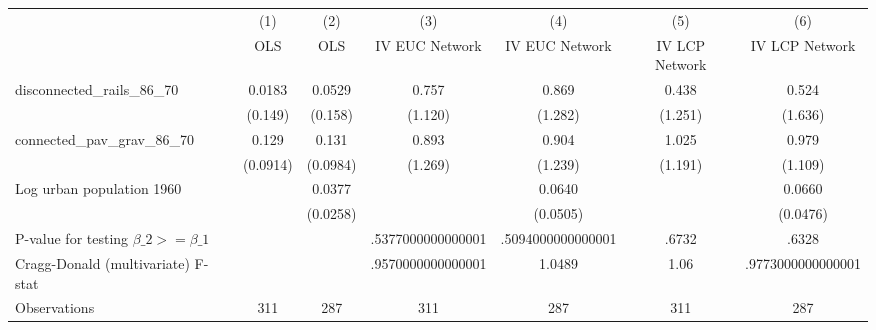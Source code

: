 {
\def\sym#1{\ifmmode^{#1}\else\(^{#1}\)\fi}
\begin{tabular}{l*{6}{c}}
\hline\hline
                &\multicolumn{1}{c}{(1)}&\multicolumn{1}{c}{(2)}&\multicolumn{1}{c}{(3)}&\multicolumn{1}{c}{(4)}&\multicolumn{1}{c}{(5)}&\multicolumn{1}{c}{(6)}\\
                &\multicolumn{1}{c}{OLS}&\multicolumn{1}{c}{OLS}&\multicolumn{1}{c}{IV EUC Network}&\multicolumn{1}{c}{IV EUC Network}&\multicolumn{1}{c}{IV LCP Network}&\multicolumn{1}{c}{IV LCP Network}\\
\hline
disconnected\_rails\_86\_70&   0.0183         &   0.0529         &    0.757         &    0.869         &    0.438         &    0.524         \\
                &  (0.149)         &  (0.158)         &  (1.120)         &  (1.282)         &  (1.251)         &  (1.636)         \\
[1em]
connected\_pav\_grav\_86\_70&    0.129         &    0.131         &    0.893         &    0.904         &    1.025         &    0.979         \\
                & (0.0914)         & (0.0984)         &  (1.269)         &  (1.239)         &  (1.191)         &  (1.109)         \\
[1em]
Log urban population 1960&                  &   0.0377         &                  &   0.0640         &                  &   0.0660         \\
                &                  & (0.0258)         &                  & (0.0505)         &                  & (0.0476)         \\
\hline
P-value for testing $\beta\_{2} >= \beta\_{1}$&                  &                  &.5377000000000001         &.5094000000000001         &    .6732         &    .6328         \\
Cragg-Donald (multivariate) F-stat&                  &                  &.9570000000000001         &   1.0489         &     1.06         &.9773000000000001         \\
Observations    &      311         &      287         &      311         &      287         &      311         &      287         \\
\hline\hline
\end{tabular}
}
